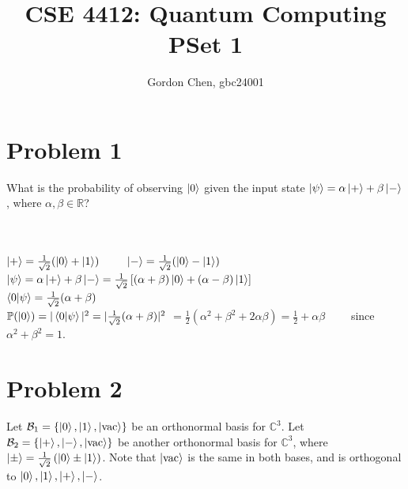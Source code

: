 \documentclass[12pt]{exam}
\begin{document}
\title{CSE 4412: Quantum Computing PSet 1}
\author{Gordon Chen, gbc24001}
\date{}
\maketitle

\section{Problem 1}
What is the probability of observing $\ket{0}$ given the input state $\ket{\psi} = \alpha \ket{+} + \beta \ket{-}$, where $\alpha,\beta \in \mathbb{R}$?
\begin{solution}\\\\
$\ket{+} = \tfrac{1}{\sqrt{2}} (\ket{0} + \ket{1})$
$\qquad \ket{-} = \tfrac{1}{\sqrt{2}} (\ket{0} - \ket{1})$ \\

$\ket{\psi} = \alpha \ket{+} + \beta \ket{-} = \tfrac{1}{\sqrt{2}} \left[ (\alpha + \beta) \ket{0} + (\alpha - \beta) \ket{1} \right]$ \\

$\braket{0 | \psi} = \tfrac{1}{\sqrt{2}} (\alpha + \beta)$ \\

$\mathbb{P}(\ket{0}) = | \braket{0 | \psi} |^2 = | \tfrac{1}{\sqrt{2}} (\alpha + \beta) |^2$
$ = \frac{1}{2} (\alpha^2 + \beta^2 + 2 \alpha \beta) = \boxed{\frac{1}{2} + \alpha \beta} \qquad$ since $\alpha^2 + \beta^2 = 1$.
\end{solution}


\section{Problem 2}
Let $\mathcal{B}_1 = \{\ket{0},\ket{1},\ket{\mathrm{vac}}\}$ be an orthonormal basis for $\mathbb{C}^3$.
Let $\mathcal{B}_2 = \{\ket{+},\ket{-},\ket{\mathrm{vac}}\}$ be another orthonormal basis for $\mathbb{C}^3$,
where $\ket{\pm} = \frac{1}{\sqrt{2}}\left(\ket{0} \pm \ket{1}\right)$.
Note that $\ket{\mathrm{vac}}$ is the same in both bases, and is orthogonal to
$\ket{0},\ket{1},\ket{+},\ket{-}$.
\end{document}
